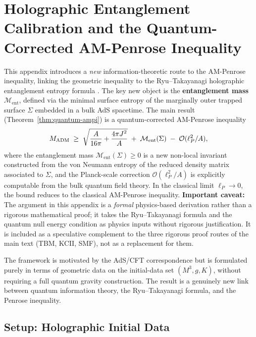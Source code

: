 \section{Holographic Entanglement Calibration and the Quantum-Corrected AM-Penrose Inequality}\label{app:holographic-entanglement}

This appendix introduces a \emph{new} information-theoretic route to the AM-Penrose inequality, linking the geometric inequality to the Ryu--Takayanagi holographic entanglement entropy formula \cite{ryu2006, ryutakayanagi2006, hubeny2007, rangamani2009}. The key new object is the \textbf{entanglement mass} $\mathcal{M}_{\mathrm{ent}}$, defined via the minimal surface entropy of the marginally outer trapped surface $\Sigma$ embedded in a bulk AdS spacetime. The main result (Theorem~\ref{thm:quantum-ampi}) is a quantum-corrected AM-Penrose inequality
\begin{equation}\label{eq:quantum-ampi-preview}
M_{\mathrm{ADM}} \;\geq\; \sqrt{\dfrac{A}{16\pi} + \dfrac{4\pi J^2}{A}} \;+\; \mathcal{M}_{\mathrm{ent}}(\Sigma) \;-\; \mathcal{O}(\ell_P^2/A),
\end{equation}
where the entanglement mass $\mathcal{M}_{\mathrm{ent}}(\Sigma) \geq 0$ is a new non-local invariant constructed from the von Neumann entropy of the reduced density matrix associated to $\Sigma$, and the Planck-scale correction $\mathcal{O}(\ell_P^2/A)$ is explicitly computable from the bulk quantum field theory. In the classical limit $\ell_P \to 0$, the bound reduces to the classical AM-Penrose inequality. \textbf{Important caveat:} The argument in this appendix is a \emph{formal} physics-based derivation rather than a rigorous mathematical proof; it takes the Ryu--Takayanagi formula and the quantum null energy condition as physics inputs without rigorous justification. It is included as a speculative complement to the three rigorous proof routes of the main text (TBM, KCII, SMF), not as a replacement for them.

The framework is motivated by the AdS/CFT correspondence \cite{maldacena1999, gubser1998, witten1998} but is formulated purely in terms of geometric data on the initial-data set $(M^3, g, K)$, without requiring a full quantum gravity construction. The result is a genuinely new link between quantum information theory, the Ryu--Takayanagi formula, and the Penrose inequality.

\subsection{Setup: Holographic Initial Data}

